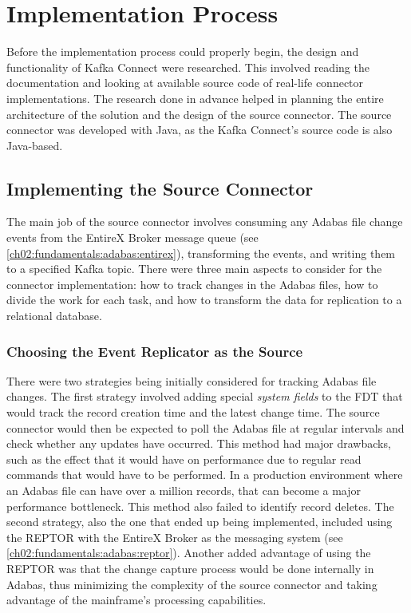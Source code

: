 \section{Implementation Process}
Before the implementation process could properly begin, the design and functionality of Kafka Connect were researched. This involved reading the documentation and looking at available source code of real-life connector implementations. The research done in advance helped in planning the entire architecture of the solution and the design of the source connector. The source connector was developed with Java, as the Kafka Connect's source code is also Java-based.

\subsection{Implementing the Source Connector}
The main job of the source connector involves consuming any Adabas file change events from the EntireX Broker message queue (see \ref{ch02:fundamentals:adabas:entirex}), transforming the events, and writing them to a specified Kafka topic. There were three main aspects to consider for the connector implementation: how to track changes in the Adabas files, how to divide the work for each task, and how to transform the data for replication to a relational database.

\subsubsection{Choosing the Event Replicator as the Source}
There were two strategies being initially considered for tracking Adabas file changes. The first strategy involved adding special \textit{system fields} to the \ac{FDT} that would track the record creation time and the latest change time. The source connector would then be expected to poll the Adabas file at regular intervals and check whether any updates have occurred. This method had major drawbacks, such as the effect that it would have on performance due to regular read commands that would have to be performed. In a production environment where an Adabas file can have over a million records, that can become a major performance bottleneck. This method also failed to identify record deletes. The second strategy, also the one that ended up being implemented, included using the \ac{REPTOR} with the EntireX Broker as the messaging system (see \ref{ch02:fundamentals:adabas:reptor}). Another added advantage of using the \ac{REPTOR} was that the change capture process would be done internally in Adabas, thus minimizing the complexity of the source connector and taking advantage of the mainframe's processing capabilities.

